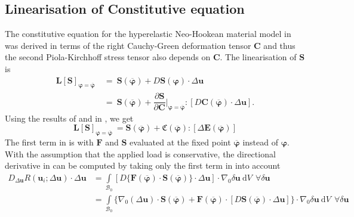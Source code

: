 \subsection{Linearisation of Constitutive equation}
The constitutive equation for the hyperelastic Neo-Hookean material model in  was derived in terms of the right Cauchy-Green deformation tensor $\mathbf{C}$ and thus the second Piola-Kirchhoff stress tensor also depends on $\mathbf{C}$. The linearisation of $\mathbf{S}$ is
\begin{align}
\mathbf{L}\left[ \mathbf{S} \right]_{\bm{\varphi} = \overline{\bm{\varphi}}} \ &= \ \mathbf{S}(\overline{\bm{\varphi}}) + D \mathbf{S}(\bm{\varphi}) \cdot \Delta\mathbf{u} \nonumber \\
&= \ \mathbf{S}(\overline{\bm{\varphi}}) + \dfrac{\partial \mathbf{S}}{\partial \mathbf{C}} \Big|_{\bm{\varphi} = \overline{\bm{\varphi}}} : \left[ D \mathbf{C}(\overline{\bm{\varphi}}) \cdot \Delta\mathbf{u} \right].
\label{eq:2.16}
\end{align}
Using the results of  and  in , we get
\begin{equation}
\mathbf{L}\left[ \mathbf{S} \right]_{\bm{\varphi} = \overline{\bm{\varphi}}} \ = \mathbf{S}(\overline{\bm{\varphi}}) + \mathfrak{C}(\overline{\bm{\varphi}}) : \left[ \Delta \mathbf{E}(\overline{\bm{\varphi}}) \right]
\label{eq:2.19}
\end{equation} \newline 
The first term in  is  with $\mathbf{F}$ and $\mathbf{S}$ evaluated at the fixed point $\overline{\bm{\varphi}}$ instead of $\bm{\varphi}$. With the assumption that the applied load is conservative, the directional derivative in  can be computed by taking only the first term in  into account
\begin{align}
D_{\Delta\mathbf{u}} R(\mathbf{u}_i; \Delta \mathbf{u}) \cdot \Delta\mathbf{u} &= \int\limits_{\mathcal{B}_0} \left[ D \{ \mathbf{F}(\overline{\bm{\varphi}}) \cdot \mathbf{S}(\overline{\bm{\varphi}})\} \cdot \Delta\mathbf{u} \right] \cdot \nabla_0 \delta\mathbf{u} \ \mathrm{d}V \ \ \forall \delta\mathbf{u} \nonumber \\
&= \int\limits_{\mathcal{B}_0} \Big\lbrace \nabla_0 (\Delta\mathbf{u}) \cdot \mathbf{S}(\overline{\bm{\varphi}}) + \mathbf{F}(\overline{\bm{\varphi}}) \cdot \left[ D \mathbf{S}(\overline{\bm{\varphi}}) \cdot \Delta\mathbf{u} \right] \Big\rbrace \cdot \nabla_0 \delta\mathbf{u} \ \mathrm{d}V \ \ \forall \delta\mathbf{u}
\label{eq:2.20}
\end{align}

